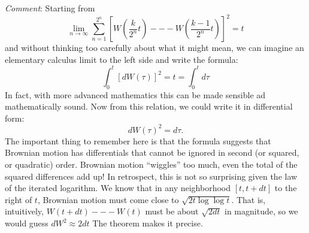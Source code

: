 \begin{solution}
\begin{solution}
\begin{solution}
\begin{solution}
\begin{solution}
\begin{solution}
\begin{solution}
\begin{solution}
\begin{solution}
\begin{solution}
{\begin{problem}
 {\it Comment}:  Starting from
  $$
    \lim_{n \to \infty}
             \sum_{n=1}^{2^n} 
               \left[ 
                  W\left( \frac{k}{2^n} t \right) --- 
                  W\left( \frac{k-1}{2^n} t \right)
               \right]^2
           = t
  $$
  and without thinking too carefully about what it might mean, we can
  imagine an elementary calculus limit to the left side and write the
  formula:
  $$
    \int_0^t [ dW(\tau) ]^2 = t = \int_0^t d\tau
  $$
  In fact, with more advanced mathematics this can be made sensible ad
  mathematically sound.  Now from this relation, we could write it in
  differential form:
  $$
    dW(\tau)^2 = d\tau.
  $$
  \ni The important thing to remember here is that the formula suggests
  that Brownian motion has differentials that cannot be ignored in
  second (or squared, or quadratic) order.  Brownian motion ``wiggles''
  too much, even the total of the squared differences add up!  In
  retrospect, this is not so surprising given the law of the iterated
  logarithm.  We know that in any neighborhood $[t, t + dt]$ to the
  right of $t$, Brownian motion must come close to $\sqrt{2t \log \log
  t}$.  That is, intuitively, $W(t+dt) --- W(t)$ must be about $\sqrt{2
  dt}$ in magnitude, so we would guess $dW^2 \approx 2dt$  The theorem
  makes it precise.
\end{problem} 
\begin{solution} 

\end{solution}

}
\end{solution}
\end{solution}
\end{solution}
\end{solution}
\end{solution}
\end{solution}
\end{solution}
\end{solution}
\end{solution}
\end{solution}
